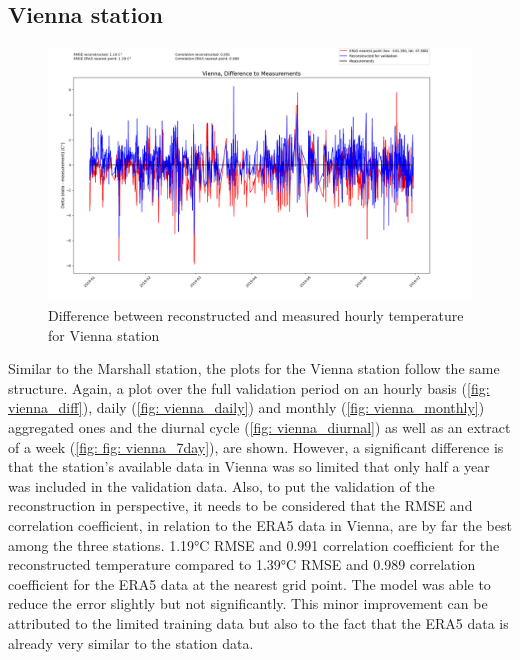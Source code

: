 \subsection*{Vienna station}
\begin{figure}[H]
\centering
\includegraphics[width=1.00\textwidth]{resources/images/charts/vienna_eval_grib_final/Vienna, Difference to Measurements.png}
\caption{Difference between reconstructed and measured hourly temperature for Vienna station}
\label{fig: vienna_diff}
\end{figure}

Similar to the Marshall station, the plots for the Vienna station follow the same structure.
Again, a plot over the full validation period on an hourly basis (\autoref{fig: vienna_diff}), daily (\autoref{fig: vienna_daily}) and monthly (\autoref{fig: vienna_monthly}) aggregated ones and the diurnal cycle (\autoref{fig: vienna_diurnal}) as well as an extract of a week (\autoref{fig: fig: vienna_7day}), are shown.
However, a significant difference is that the station's available data in Vienna was so limited that only half a year was included in the validation data.
Also, to put the validation of the reconstruction in perspective, it needs to be considered that the RMSE and correlation coefficient, in relation to the ERA5 data in Vienna, are by far the best among the three stations.
1.19°C RMSE and 0.991 correlation coefficient for the reconstructed temperature compared to 1.39°C RMSE and 0.989 correlation coefficient for the ERA5 data at the nearest grid point.
The model was able to reduce the error slightly but not significantly.
This minor improvement can be attributed to the limited training data but also to the fact that the ERA5 data is already very similar to the station data.

